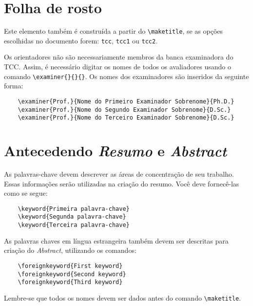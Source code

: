 \documentclass[report]{uftex}
\begin{document}
\section{Folha de rosto}
\label{cap:folhaderosto}

\noindent Este elemento também é construída a partir do \verb+\maketitle+, se as opções escolhidas no documento forem: \verb+tcc+, \verb+tcc1+ ou \verb+tcc2+. 
	
Os orientadores não são necessariamente membros da banca examinadora do TCC. Assim, é necessário digitar os nomes de todos os avaliadores usando o comando \verb+\examiner{}{}{}+. Os nomes dos examinadores são inseridos da seguinte forma:

\begin{verbatim}
	\examiner{Prof.}{Nome do Primeiro Examinador Sobrenome}{Ph.D.}
	\examiner{Prof.}{Nome do Segundo Examinador Sobrenome}{D.Sc.}
	\examiner{Prof.}{Nome do Terceiro Examinador Sobrenome}{D.Sc.}
\end{verbatim}	

\section{Antecedendo \emph{Resumo} e \emph{Abstract}}

As palavras-chave devem descrever as áreas de concentração de seu trabalho. Essas informações serão utilizadas na criação do resumo. Você deve fornecê-las como se segue:

\begin{verbatim}
	\keyword{Primeira palavra-chave}
	\keyword{Segunda palavra-chave}
	\keyword{Terceira palavra-chave}
\end{verbatim}


As palavras chaves em língua estrangeira também devem ser descritas para criação do \emph{Abstract}, utilizando os comandos:

\begin{verbatim}
	\foreignkeyword{First keyword}
	\foreignkeyword{Second keyword}
	\foreignkeyword{Third keyword}
\end{verbatim}

{\color{red}Lembre-se que todos os nomes devem ser dados antes do comando \verb+\maketitle+.}
\end{document}

